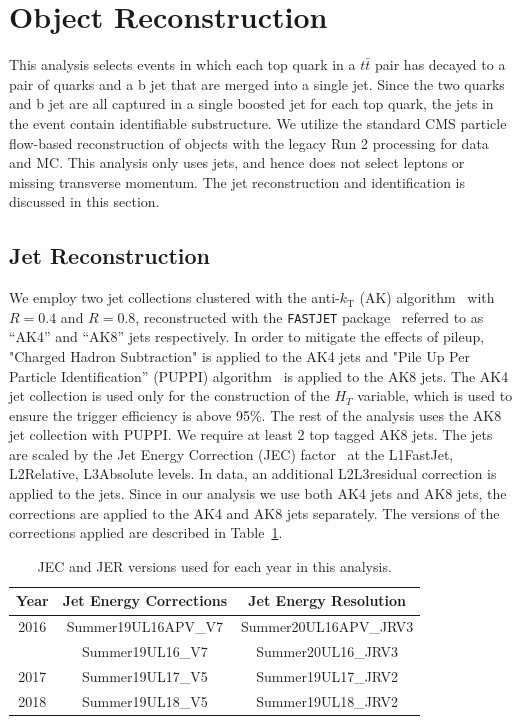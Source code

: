 \section{Object Reconstruction}
\label{sec:reco}

This analysis selects events in which each top quark in a $t\bar{t}$ pair has decayed to a pair of quarks and a b jet that are merged into a single jet. Since the two quarks and b jet are all captured in a single boosted jet for each top quark, the jets in the event contain identifiable substructure. We utilize the standard CMS particle flow-based reconstruction of objects with the legacy Run 2 processing for data and MC. This analysis only uses jets, and hence does not select leptons or missing transverse momentum. The jet reconstruction and identification is discussed in this section.

\subsection{Jet Reconstruction}
\label{sec:jetreco}

We employ two jet collections clustered with the anti-$k_{\mathrm{T}}$ (AK) algorithm~\cite{antikt} with $R=0.4$ and $R=0.8$, reconstructed with the {\tt FASTJET} package~\cite{fastjet} referred to as ``AK4'' and ``AK8'' jets respectively. In order to mitigate the effects of pileup, "Charged Hadron Subtraction" is applied to the AK4 jets and "Pile Up Per Particle Identification'' (PUPPI) algorithm~\cite{puppi} is applied to the AK8 jets. The AK4 jet collection is used only for the construction of the $H_T$ variable, which is used to ensure the trigger efficiency is above 95\%. The rest of the analysis uses the AK8 jet collection with PUPPI. We require at least 2 top tagged AK8 jets. The jets are scaled by the Jet Energy Correction (JEC) factor~\cite{CMS:JEC} at the L1FastJet, L2Relative, L3Absolute levels. In data, an additional L2L3residual correction is applied to the jets. Since in our analysis we use both AK4 jets and AK8 jets, the corrections are applied to the AK4 and AK8 jets separately. The versions of the corrections applied are described in Table~\ref{tab:jerc}.


\begin{table}[!h]
	\centering
	\begin{tabular}{|ccc|} \hline
		Year       &  Jet Energy Corrections  &  Jet Energy Resolution   \\ \hline
		2016    &  Summer19UL16APV\_V7     &  Summer20UL16APV\_JRV3      \\
		&  Summer19UL16\_V7        &  Summer20UL16\_JRV3      \\
		2017         &  Summer19UL17\_V5        &  Summer19UL17\_JRV2   \\
		2018         &  Summer19UL18\_V5        &  Summer19UL18\_JRV2   \\\hline
	\end{tabular}
	\caption{JEC and JER versions used for each year in this analysis.}
	\label{tab:jerc}
\end{table}


